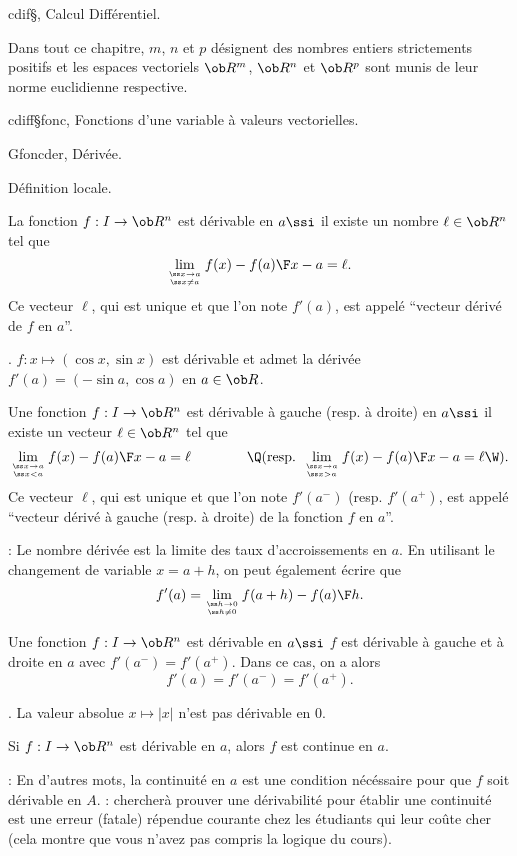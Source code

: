 \Chapter cdif§, Calcul Différentiel. 

\bigskip
Dans tout ce chapitre, $m$, $n$ et $p$ désignent des nombres entiers strictements positifs et les espaces vectoriels $\ob R^m$, $\ob R^n$ et $\ob R^p$ sont munis de leur norme euclidienne respective. 
\bigskip

\Section cdiff§fonc, Fonctions d'une variable à valeurs vectorielles. 

\Subsection Gfoncder, Dérivée. 

\Concept Définition locale. 

\Definition [$a\in I$ intervalle]
La fonction $f:I\to\ob R^n$ est dérivable en $a\ssi$ il existe un nombre $\ell\in\ob R^n$ tel que 
$$
\lim_{\ss x\to a\atop\ss x\neq a}{f(x)-f(a)\F x-a}=\ell. 
$$
Ce vecteur $\ell$, qui est unique et que l'on note $f'(a)$, est appelé ``vecteur dérivé de $f$ en $a$''. 

\Exemple. $f:x\mapsto(\cos x,\sin x)$ est dérivable et admet la dérivée $f'(a)=(-\sin a, \cos a)$ en $a\in\ob R$. 

\Definition [$a\in I$ intervalle] 
Une fonction $f:I\to\ob R^n$ est dérivable à gauche (resp. à droite) en $a\ssi$ il existe un vecteur $\ell\in\ob R^n$ tel que 
$$
\lim_{\ss x\to a\atop\ss x<a}{f(x)-f(a)\F x-a}=\ell\qquad\qquad\Q(\mbox{resp. }\lim_{\ss x\to a\atop\ss x>a}{f(x)-f(a)\F x-a}=\ell\W). 
$$
Ce vecteur $\ell$, qui est unique et que l'on note $f'(a^-)$ (resp. $f'(a^+)$, est appelé ``vecteur dérivé à gauche (resp. à droite) 
de la fonction $f$ en $a$''. 

\Remarque : Le nombre dérivée est la limite des taux d'accroissements en $a$. En utilisant le changement de variable $x=a+h$, on peut également écrire que 
$$
f'(a)=\lim_{\ss h\to 0\atop\ss h\neq 0}{f(a+h)-f(a)\F h}. 
$$

Une fonction $f:I\to\ob R^n$ est dérivable en $a\ssi$ $f$ est dérivable à gauche et à droite en $a$ avec $f'(a^-)=f'(a^+)$. 
Dans ce cas, on a alors
$$
f'(a)=f'(a^-)=f'(a^+).
$$

\Exemple. La valeur absolue $x\mapsto|x|$ n'est pas dérivable en $0$. 
\bigskip

\Propriete [$a\in I$ intervalle] 
Si $f:I\to\ob R^n$ est dérivable en $a$, alors $f$ est continue en $a$. 

\Remarque : En d'autres mots, la continuité en $a$ est une condition nécéssaire pour que $f$ soit dérivable en $A$. 
\bigskip
\Remarque : chercherà prouver une dérivabilité pour établir une continuité est une erreur (fatale) répendue courante chez les étudiants qui leur coûte cher (cela montre que vous n'avez pas compris la logique du cours). 
\bigskip

